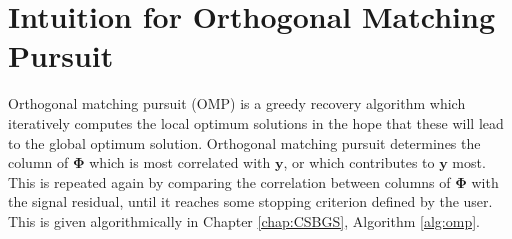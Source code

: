 





\section{Intuition for Orthogonal Matching Pursuit}
\label{sec:intuition_omp}



Orthogonal matching pursuit (OMP) \citep{Tropp2004} is a greedy recovery algorithm which iteratively computes the local optimum solutions in the hope that these will lead to the global optimum solution. Orthogonal matching pursuit determines the column of $\boldsymbol{\Phi}$ which is most correlated with $\boldsymbol{y}$, or which contributes to $\boldsymbol{y}$ most. This is repeated again by comparing the correlation between columns of $\boldsymbol{\Phi}$ with the signal residual, until it reaches some stopping criterion defined by the user. This is given algorithmically in Chapter \ref{chap:CSBGS}, Algorithm \ref{alg:omp}.

